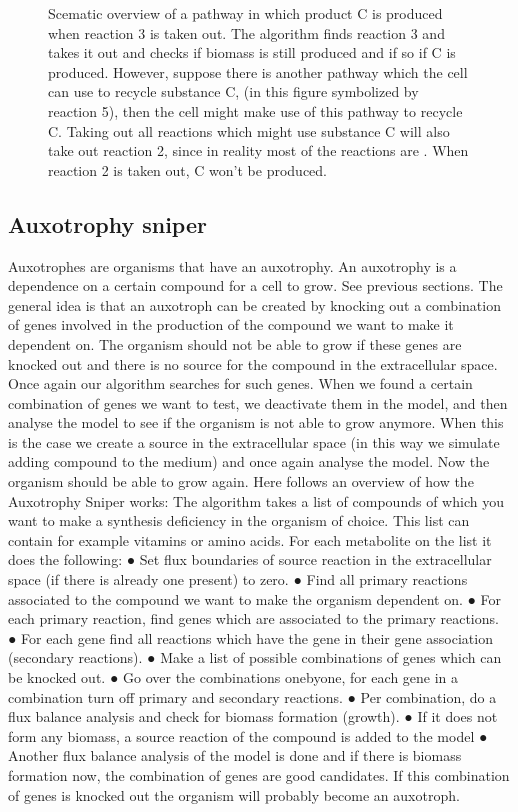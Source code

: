 \documentclass[10pt]{report}
\begin{document}
\begin{figure}[hbtp]
  \centering
     
      \caption{Scematic overview of a pathway in which product C is produced when reaction 3 is taken out. The algorithm finds reaction 3 and takes it out and checks if biomass is still produced and if so if C is produced. However, suppose there is another pathway which the cell can use to recycle substance C, (in this figure symbolized by reaction 5), then the cell might make use of this pathway to recycle C. Taking out all reactions which might use substance C will also take out reaction 2, since in reality most of the reactions are . When reaction 2 is taken out, C won't be produced.}
  \label{fig:reaction-overview}
\end{figure}

\subsection{Auxotrophy sniper}
Auxotrophes are organisms that have an auxotrophy. An auxotrophy is a dependence on a certain compound for a cell to grow. See previous sections.
The general idea is that an auxotroph can be created by knocking out a combination of genes involved in the production of the compound we want to make it dependent on.
The organism should not be able to grow if these genes are knocked out and there is no source for the compound in the extracellular space.
Once again our algorithm searches for such genes. When we found a certain combination of genes we want to test, we deactivate them in the model, and then analyse the model to see if the organism is not able to grow anymore.
When this is the case we create a source in the extracellular space (in this way we simulate adding compound to the medium) and once again analyse the model. Now the organism should be able to grow again. Here follows an overview of how the Auxotrophy Sniper works: 
The algorithm takes a list of compounds of which you want to make a synthesis deficiency in the 
organism of choice. This list can contain for example vitamins or amino acids. For each 
metabolite on the list it does the following: 
● Set flux boundaries of source reaction in the extracellular space (if there is already one 
present) to zero. 
● Find all primary reactions associated to the compound we want to make the organism 
dependent on. 
● For each primary reaction, find genes which are associated to the primary reactions. 
● For each gene find all reactions which have the gene in their gene association 
(secondary reactions). 
● Make a list of possible combinations of genes which can be knocked out. 
● Go over the combinations one­by­one, for each gene in a combination turn off primary 
and secondary reactions. 
● Per combination, do a flux balance analysis and check for biomass formation (growth). 
● If it does not form any biomass, a source reaction of the compound is added to the 
model ●
Another flux balance analysis of the model is done and if there is biomass formation 
now, the combination of genes are good candidates. If this combination of genes is 
knocked out the organism will probably become an auxotroph.
\end{document}

